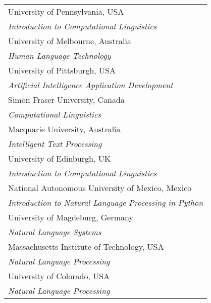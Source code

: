 \documentclass[11pt]{article}
\begin{document}
\begin{table}[bt]
\small\noindent
\begin{boxedminipage}{\linewidth}
\begin{tabular}{l}
University of Pennsylvania, USA \\
\hspace{2ex}
\textit{Introduction to Computational Linguistics} \\[.5ex]

University of Melbourne, Australia \\
\hspace{2ex}
\textit{Human Language Technology} \\[.5ex]

University of Pittsburgh, USA \\
\hspace{2ex}
\textit{Artificial Intelligence Application Development} \\[.5ex]

Simon Fraser University, Canada \\
\hspace{2ex}
\textit{Computational Linguistics} \\[.5ex]

Macquarie University, Australia \\
\hspace{2ex}
\textit{Intelligent Text Processing} \\[.5ex]

University of Edinburgh, UK \\
\hspace{2ex}
\textit{Introduction to Computational Linguistics} \\[.5ex]

National Autonomous University of Mexico, Mexico \\
\hspace{2ex}
\textit{Introduction to Natural Language Processing in Python} \\[.5ex]

University of Magdeburg, Germany \\
\hspace{2ex}
\textit{Natural Language Systems} \\[.5ex]

Massachusetts Institute of Technology, USA \\
\hspace{2ex}
\textit{Natural Language Processing} \\[.5ex]

University of Colorado, USA \\
\hspace{2ex}
\textit{Natural Language Processing} \\[.5ex]


\end{tabular}
\end{boxedminipage}
\end{table}
\end{document}
